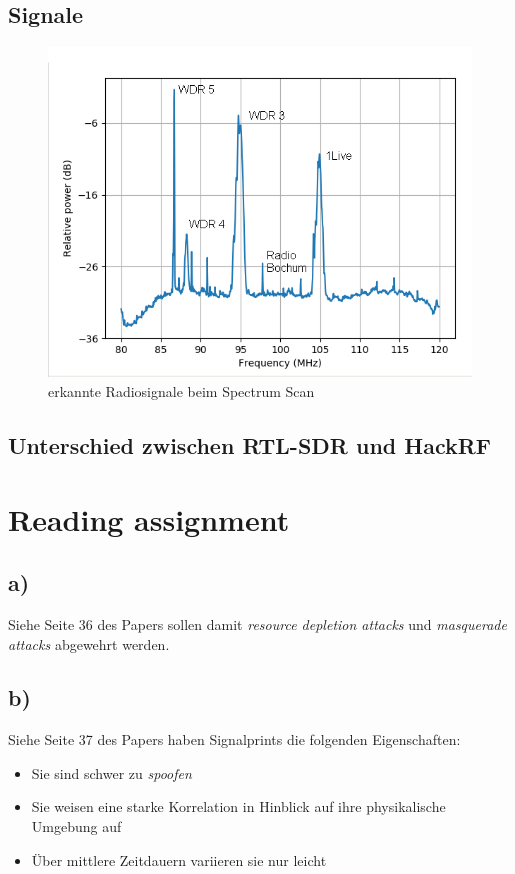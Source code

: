 \documentclass[12pt,a4paper]{article}
\begin{document}
\subsection*{Signale}
\begin{figure}[hbt!]
	\centering
		\includegraphics[width=1\textwidth ]
		{Bilder/a3_ukw.png}
		\caption{erkannte Radiosignale beim Spectrum Scan}
\end{figure}
\subsection*{Unterschied zwischen RTL-SDR und HackRF}

\newpage
\section{Reading assignment}

\subsection*{a)} 
Siehe Seite 36 des Papers sollen damit \textit{resource 
depletion attacks} und \textit{masquerade attacks} 
abgewehrt werden.


\subsection*{b)} 
Siehe Seite 37 des Papers haben Signalprints die folgenden 
Eigenschaften:

\begin{itemize}
	\item Sie sind schwer zu \textit{spoofen} 
	\item Sie weisen eine starke Korrelation in Hinblick auf ihre 
	physikalische Umgebung auf
	\item Über mittlere Zeitdauern variieren sie nur leicht 
\end{itemize}
\end{document}
